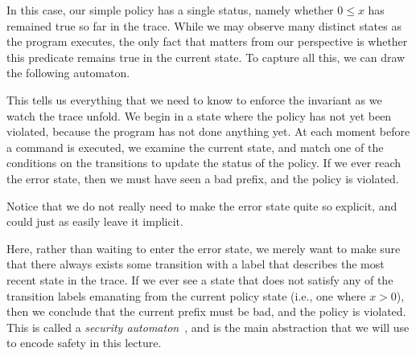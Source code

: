 \documentclass[11pt,twoside]{scrartcl}
\begin{document}
In this case, our simple policy has a single status, namely whether $0 \le x$ has remained true so far in the trace.
While we may observe many distinct states as the program executes, the only fact that matters from our perspective is whether this predicate remains true in the current state.
To capture all this, we can draw the following automaton.
\begin{center}
\end{center}
This tells us everything that we need to know to enforce the invariant as we watch the trace unfold.
We begin in a state where the policy has not yet been violated, because the program has not done anything yet.
At each moment before a command is executed, we examine the current state, and match one of the conditions on the transitions to update the status of the policy.
If we ever reach the error state, then we must have seen a bad prefix, and the policy is violated.

Notice that we do not really need to make the error state quite so explicit, and could just as easily leave it implicit.
\begin{center}
\end{center}
Here, rather than waiting to enter the error state, we merely want to make sure that there always exists some transition with a label that describes the most recent state in the trace.
If we ever see a state that does not satisfy any of the transition labels emanating from the current policy state (i.e., one where $x > 0$), then we conclude that the current prefix must be bad, and the policy is violated.
This is called a \emph{security automaton}~\cite{Schneider2000}, and is the main abstraction that we will use to encode safety in this lecture.
\end{document}
